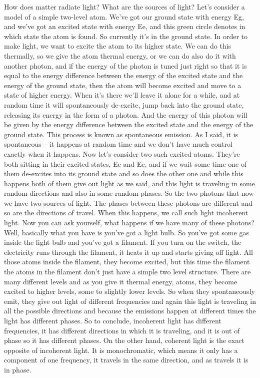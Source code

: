 How does matter radiate light? What are the sources of light? Let's consider a model of a simple two-level atom. We've got our ground state with energy Eg, and we've got an excited state with energy Ee, and this green circle denotes in which state the atom is found. So currently it's in the ground state. In order to make light, we want to excite the atom to its higher state. We can do this thermally, so we give the atom thermal energy, or we can do also do it with another photon, and if the energy of the photon is tuned just right so that it is equal to the energy difference between the energy of the excited state and the energy of the ground state, then the atom will become excited and move to a state of higher energy. When it's there we'll leave it alone for a while, and at random time it will spontaneously de-excite, jump back into the ground state, releasing its energy in the form of a photon. And the energy of this photon will be given by the energy difference between the excited state and the energy of the ground state. This process is known as spontaneous emission. As I said, it is spontaneous -- it happens at random time and we don't have much control exactly when it happens. 
Now let's consider two such excited atoms. They're both sitting in their excited states, Ee and Ee, and if we wait some time one of them de-excites into its ground state and so does the other one and while this happens both of them give out light as we said, and this light is traveling in some random directions and also in some random phases. So the two photons that now we have two sources of light. The phases between these photons are different and so are the directions of travel. When this happens, we call such light incoherent light. Now you can ask yourself, what happens if we have many of these photons? Well, basically what you have is you've got a light bulb. So you've got some gas inside the light bulb and you've got a filament. If you turn on the switch, the electricity runs through the filament, it heats it up and starts giving off light. All those atoms inside the filament, they become excited, but this time the filament the atoms in the filament don't just have a simple two level structure. There are many different levels and as you give it thermal energy, atoms, they become excited to higher levels, some to slightly lower levels. So when they spontaneously emit, they give out light of different frequencies and again this light is traveling in all the possible directions and because the emissions happen at different times the light has different phases. So to conclude, incoherent light has different frequencies, it has different directions in which it is traveling, and it is out of phase so it has different phases. On the other hand, coherent light is the exact opposite of incoherent light. It is monochromatic, which means it only has a component of one frequency, it travels in the same direction, and as travels it is in phase.

